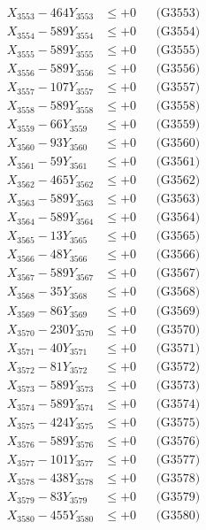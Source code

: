 \documentclass[a4paper,10pt]{article}
\begin{document}
{\begin{align}
X_{3553} - 464Y_{3553} &\leq +0 && \text{(G3553)} \\
X_{3554} - 589Y_{3554} &\leq +0 && \text{(G3554)} \\
X_{3555} - 589Y_{3555} &\leq +0 && \text{(G3555)} \\
X_{3556} - 589Y_{3556} &\leq +0 && \text{(G3556)} \\
X_{3557} - 107Y_{3557} &\leq +0 && \text{(G3557)} \\
X_{3558} - 589Y_{3558} &\leq +0 && \text{(G3558)} \\
X_{3559} - 66Y_{3559} &\leq +0 && \text{(G3559)} \\
X_{3560} - 93Y_{3560} &\leq +0 && \text{(G3560)} \\
\allowbreak
X_{3561} - 59Y_{3561} &\leq +0 && \text{(G3561)} \\
X_{3562} - 465Y_{3562} &\leq +0 && \text{(G3562)} \\
X_{3563} - 589Y_{3563} &\leq +0 && \text{(G3563)} \\
X_{3564} - 589Y_{3564} &\leq +0 && \text{(G3564)} \\
X_{3565} - 13Y_{3565} &\leq +0 && \text{(G3565)} \\
X_{3566} - 48Y_{3566} &\leq +0 && \text{(G3566)} \\
X_{3567} - 589Y_{3567} &\leq +0 && \text{(G3567)} \\
X_{3568} - 35Y_{3568} &\leq +0 && \text{(G3568)} \\
X_{3569} - 86Y_{3569} &\leq +0 && \text{(G3569)} \\
X_{3570} - 230Y_{3570} &\leq +0 && \text{(G3570)} \\
\allowbreak
X_{3571} - 40Y_{3571} &\leq +0 && \text{(G3571)} \\
X_{3572} - 81Y_{3572} &\leq +0 && \text{(G3572)} \\
X_{3573} - 589Y_{3573} &\leq +0 && \text{(G3573)} \\
X_{3574} - 589Y_{3574} &\leq +0 && \text{(G3574)} \\
X_{3575} - 424Y_{3575} &\leq +0 && \text{(G3575)} \\
X_{3576} - 589Y_{3576} &\leq +0 && \text{(G3576)} \\
X_{3577} - 101Y_{3577} &\leq +0 && \text{(G3577)} \\
X_{3578} - 438Y_{3578} &\leq +0 && \text{(G3578)} \\
X_{3579} - 83Y_{3579} &\leq +0 && \text{(G3579)} \\
X_{3580} - 455Y_{3580} &\leq +0 && \text{(G3580)} \\

\end{align}}
\end{document}
